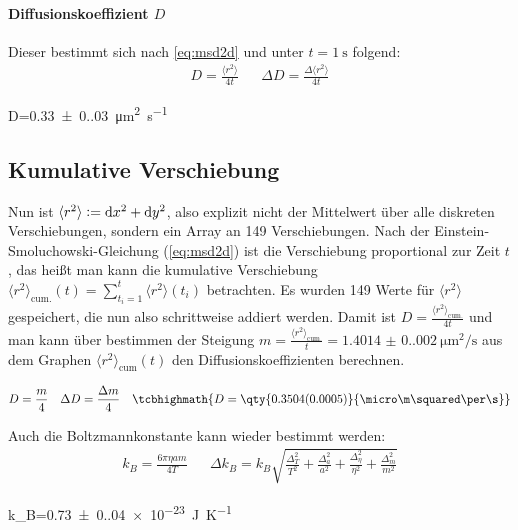 \paragraph{Diffusionskoeffizient \(D\)} Dieser bestimmt sich nach \cref{eq:msd2d} und unter \(t=\qty{1}{\s}\) folgend:
\begin{align}
    D=\frac{\langle r^2 \rangle}{4t}&&\Delta D=\frac{\Delta \langle r^2 \rangle}{4t}
\end{align}
\begin{rb}
    D=\qty{0.33(0.03)}{\micro\m\squared\per\s}
\end{rb}

\subsection{Kumulative Verschiebung}
Nun ist \(\langle r^2 \rangle\vcentcolon=\mathop{}\!\mathrm{d} x^2 + \mathop{}\!\mathrm{d} y^2\), also explizit nicht der Mittelwert über alle diskreten Verschiebungen, sondern ein Array an 149 Verschiebungen.
Nach der Einstein-Smoluchowski-Gleichung (\ref{eq:msd2d}) ist die Verschiebung proportional zur Zeit \(t\), das heißt man kann die kumulative Verschiebung \(\langle r^2\rangle_\text{cum.}(t)=\sum_{t_i=1}^t \langle r^2 \rangle (t_i) \) betrachten. Es wurden 149 Werte für \(\langle r^2 \rangle\) gespeichert, die nun also schrittweise addiert werden. Damit ist \(D=\frac{\langle r^2\rangle_\text{cum.}}{4t}\) und man kann über bestimmen der Steigung \(m=\frac{\langle r^2 \rangle_\text{cum.}}{t}=\qty{1.4014(0.0020)}{\micro\m\squared\per\s}\) aus dem Graphen \(\langle r^2 \rangle_\text{cum} (t)\) den Diffusionskoeffizienten berechnen. 

\begin{align}
    D=\frac{m}{4}&&\Delta D=\frac{\Delta m}{4}&&\tcbhighmath{D=\qty{0.3504(0.0005)}{\micro\m\squared\per\s}}
\end{align}

Auch die Boltzmannkonstante kann wieder bestimmt werden:
\begin{align}
    k_B=\frac{6\pi\eta a m}{4T}&&\Delta k_B=k_B\sqrt{\frac{\Delta_{T}^{2}}{T^{2}} + \frac{\Delta_{a}^{2}}{a^{2}} + \frac{\Delta_{\eta}^{2}}{\eta^{2}} + \frac{\Delta_{m}^{2}}{m^{2}}}
\end{align}
\begin{rb}
    k_B=\qty{0.73(0.04)e-23}{\J\per\K}
\end{rb}


